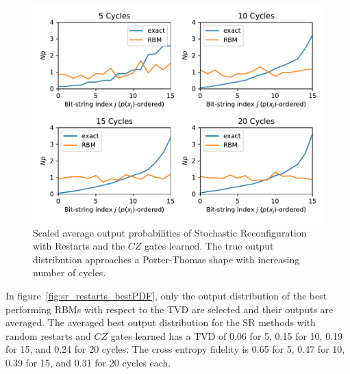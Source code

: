 \begin{figure}[H]
  \centering
  \includegraphics[width=\textwidth]{figures/results/SR-restarts-learned/avgPDF.pdf}
  \caption[Scaled average output probabilities of Stochastic Reconfiguration with Restarts Learned]{
    Scaled average output probabilities of Stochastic Reconfiguration with Restarts and the $CZ$ gates learned. The true 
    output distribution approaches a Porter-Thomas shape with increasing number of cycles.}
  \label{fig:sr_restarts_avgPDF}
\end{figure}

In figure~\ref{fig:sr_restarts_bestPDF}, only the output distribution of the best performing RBMs with respect to the 
TVD are selected and their outputs are averaged. The averaged best output distribution for the SR methods with 
random restarts and $CZ$ gates learned has a TVD of 0.06 for 5, 0.15 for 10, 0.19 for 15, and 0.24 for 20
cycles. The cross entropy fidelity is 0.65 for 5, 0.47 for 10, 0.39 for 15, and 0.31 for 20 cycles each. 

